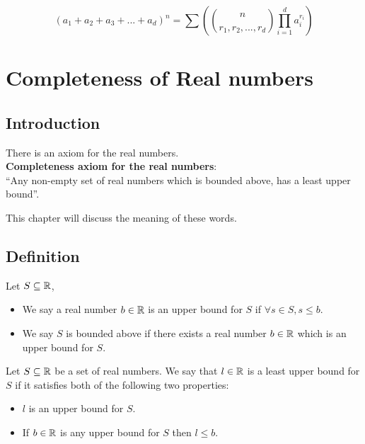 \documentclass[a4paper]{article}
\begin{document}
\begin{nthm}
$$(a_1 + a_2 + a_3 + ... + a_d)^n = \sum \left( \binom{n}{r_1, r_2, ..., r_d}\prod^d_{i=1} a^{r_i}_i \right)$$
\end{nthm}

\section{Completeness of Real numbers}
\subsection{Introduction}
There is an axiom for the real numbers.
\vspace{0.2cm}\\
\textbf{Completeness axiom for the real numbers}:\\
``Any non-empty set of real numbers which is bounded above, has a least upper bound''.

This chapter will discuss the meaning of these words.\\

\subsection{Definition}
\begin{defi}
Let $S \subseteq \mathbb{R}$,
\begin{itemize}
	\item We say a real number $b \in \mathbb{R}$ is an upper bound for $S$ if $\forall s \in S, s \leq b$.
	\item We say $S$ is bounded above if there exists a real number $b \in \mathbb{R}$ which is an upper bound for $S$.
\end{itemize}
\end{defi}

\begin{defi}
Let $S \subseteq \mathbb{R}$ be a set of real numbers. We say that $l \in \mathbb{R}$ is a least upper bound for $S$ if it satisfies both of the following two properties:
\begin{itemize}
	\item $l$ is an upper bound for $S$.
	\item If $b \in \mathbb{R}$ is any upper bound for $S$ then $l \leq b$.
\end{itemize}
\end{defi}
\end{document}
